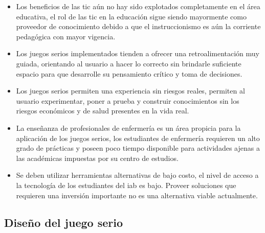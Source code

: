 \begin{itemize}

\item Los beneficios de las \gls{tic} aún no hay sido explotados completamente
    en el área  educativa, el rol de las \gls{tic} en la educación sigue siendo
    mayormente como proveedor de conocimiento debido a que el instruccionismo es
    aún la corriente pedagógica con mayor vigencia.

\item Los juegos serios implementados tienden a ofrecer una retroalimentación muy guiada, orientando 
    al usuario a hacer lo correcto sin brindarle suficiente espacio para que 
    desarrolle su pensamiento crítico y toma de decisiones.

\item Los juegos serios permiten una experiencia sin riesgos reales, permiten
    al usuario experimentar, poner a prueba y construir conocimientos sin los
    riesgos económicos y de salud presentes en la vida real.

\item La enseñanza de profesionales de enfermería es un área propicia para la
    aplicación de los juegos serios, los estudiantes de enfermería requieren un
    alto grado de prácticas y poseen poco tiempo disponible para actividades
    ajenas a las académicas impuestas por su centro de estudios. 
    
\item Se deben utilizar herramientas alternativas de bajo costo, el nivel de acceso a la
    tecnología de los estudiantes del \gls{iab} es bajo. Proveer soluciones que
    requieren una inversión importante no es una alternativa viable actualmente.

\end{itemize}

\subsection{Diseño del juego serio}

